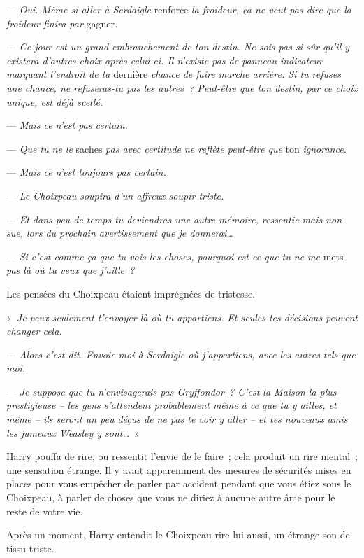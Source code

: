 --- \emph{Oui. Même si aller à Serdaigle} renforce \emph{la froideur, ça ne veut pas dire que la froideur finira par} gagner\emph{.}

--- \emph{Ce jour est un grand embranchement de ton destin. Ne sois pas si sûr qu'il y existera d'autres choix après celui-ci. Il n'existe pas de panneau indicateur marquant l'endroit de ta} dernière \emph{chance de faire marche arrière. Si tu refuses une chance, ne refuseras-tu pas les autres~? Peut-être que ton destin, par ce choix unique, est déjà scellé.}

--- \emph{Mais ce n'est pas certain.}

--- \emph{Que tu ne le} saches \emph{pas avec certitude ne reflète peut-être que} ton \emph{ignorance.}

--- \emph{Mais ce n'est toujours pas certain.}

--- \emph{Le Choixpeau soupira d'un affreux soupir triste.}

--- \emph{Et dans peu de temps tu deviendras une autre mémoire, ressentie mais non sue, lors du prochain avertissement que je donnerai…}

--- \emph{Si c'est comme ça que tu vois les choses, pourquoi est-ce que tu ne me} mets \emph{pas là où tu veux que j'aille~?}

Les pensées du Choixpeau étaient imprégnées de tristesse.

«~\emph{Je peux seulement t'envoyer là où tu appartiens. Et seules tes décisions peuvent changer cela.}

--- \emph{Alors c'est dit. Envoie-moi à Serdaigle où j'appartiens, avec les autres tels que moi.}

--- \emph{Je suppose que tu n'envisagerais pas Gryffondor~? C'est la Maison la plus prestigieuse -- les gens s'attendent probablement même à ce que tu y ailles, et même -- ils seront un peu déçus de ne pas te voir y aller -- et tes nouveaux amis les jumeaux Weasley y sont…}~»

Harry pouffa de rire, ou ressentit l'envie de le faire~; cela produit un rire mental~; une sensation étrange. Il y avait apparemment des mesures de sécurités mises en places pour vous empêcher de parler par accident pendant que vous étiez sous le Choixpeau, à parler de choses que vous ne diriez à aucune autre âme pour le reste de votre vie.

Après un moment, Harry entendit le Choixpeau rire lui aussi, un étrange son de tissu triste.


